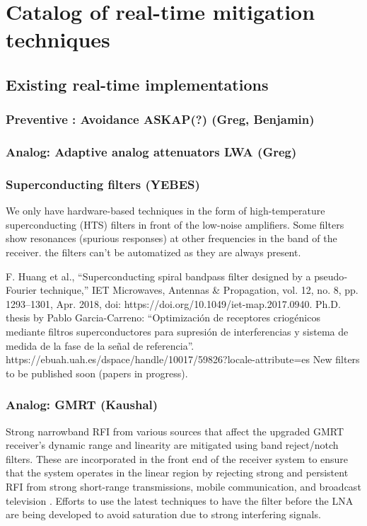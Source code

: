 \section{Catalog of real-time mitigation techniques}
\label{section:hardware:catalog}

\subsection{Existing real-time implementations}
\label{subsection:hardware:catalog:existing}
\subsubsection{Preventive : Avoidance ASKAP(?) (Greg, Benjamin)}

\subsubsection{Analog: Adaptive analog attenuators LWA (Greg)}

\subsubsection{Superconducting filters (YEBES)}
We only have hardware-based techniques in the form of high-temperature superconducting (HTS) filters in front of the low-noise amplifiers.
Some filters show resonances (spurious responses) at other frequencies in the band of the receiver.
the filters can’t be automatized as they are always present.

F. Huang et al., “Superconducting spiral bandpass filter designed by a pseudo‐Fourier technique,” IET Microwaves, Antennas \& Propagation, vol. 12, no. 8, pp. 1293–1301, Apr. 2018, doi: https://doi.org/10.1049/iet-map.2017.0940.
Ph.D. thesis by Pablo Garcia-Carreno: “Optimización de receptores criogénicos mediante filtros superconductores para supresión de interferencias y sistema de medida de la fase de la señal de referencia”. https://ebuah.uah.es/dspace/handle/10017/59826?locale-attribute=es
New filters to be published soon (papers in progress).


\subsubsection{Analog: GMRT (Kaushal)}

Strong narrowband RFI from various sources that affect the upgraded GMRT receiver’s dynamic range and linearity are mitigated using band reject/notch filters. These are incorporated in the front end of the receiver system to ensure that the system operates in the linear region by rejecting strong and persistent RFI from strong short-range transmissions, mobile communication, and broadcast television \cite{sureshkumar2016rfi}. Efforts to use the latest techniques to have the filter before the LNA are being developed to avoid saturation due to strong interfering signals.

